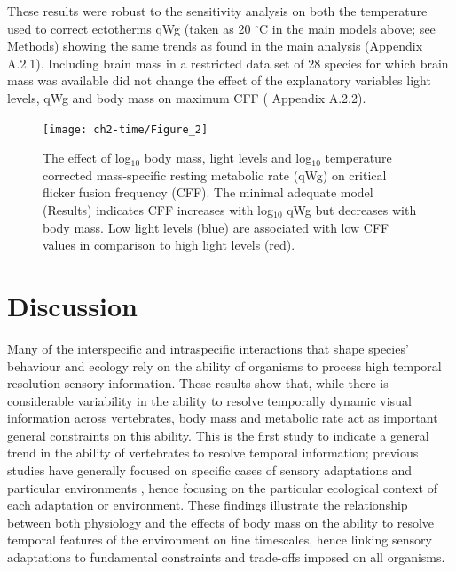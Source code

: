 These results were robust to the sensitivity analysis on both the temperature used to correct ectotherms qWg (taken as 20 $^{\circ}$C in the main models above; see Methods) showing the same trends as found in the main analysis (Appendix A.2.1). Including brain mass in a restricted data set of 28 species for which brain mass was available did not change the effect of the explanatory variables light levels, qWg and body mass on maximum CFF ( Appendix A.2.2).


\begin{figure}[h!]
  \centering
  \texttt{[image: ch2-time/Figure\_2]}
  \caption[ ]{The effect of log$_10$ body mass, light levels and log$_10$ temperature corrected mass-specific resting metabolic rate (qWg) on critical flicker fusion frequency (CFF). The minimal adequate model (Results) indicates CFF increases with log$_10$ qWg but decreases with body mass. Low light levels (blue) are associated with low CFF values in comparison to high light levels (red).}
  \label{fig:Figure 2.3}
\end{figure}


\section{Discussion}
Many of the interspecific and intraspecific interactions that shape species' behaviour and ecology rely on the ability of organisms to process high temporal resolution sensory information. These results show that, while there is considerable variability in the ability to resolve temporally dynamic visual information across vertebrates, body mass and metabolic rate act as important general constraints on this ability. This is the first study to indicate a general trend in the ability of vertebrates to resolve temporal information; previous studies have generally focused on specific cases of sensory adaptations \citep{fritsches2005warm} and particular environments \citep{frank1999comparative,frank2012light}, hence focusing on the particular ecological context of each adaptation or environment. These findings illustrate the relationship between both physiology and the effects of body mass on the ability to resolve temporal features of the environment on fine timescales, hence linking sensory adaptations to fundamental constraints and trade-offs imposed on all organisms.


